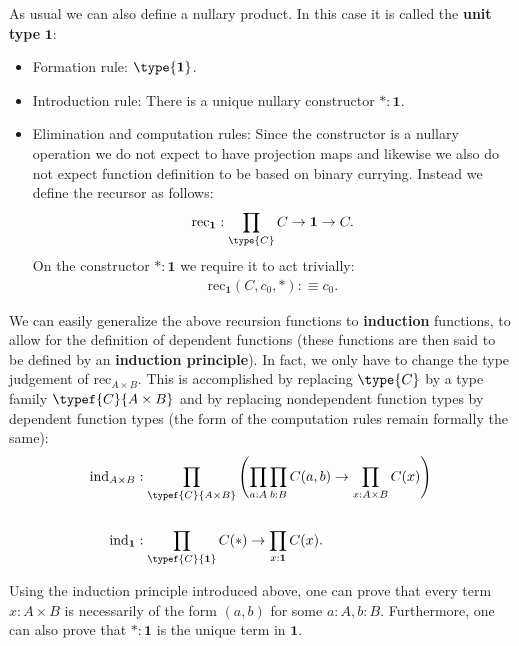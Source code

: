 {        As usual we can also define a nullary product. In this case it is called the \textbf{unit type} $\mathbf{1}$:
        \begin{itemize}
            \item Formation rule: $\type{\mathbf{1}}$.
            \item Introduction rule: There is a unique nullary constructor $\ast:\mathbf{1}$.
            \item Elimination and computation rules: Since the constructor is a nullary operation we do not expect to have projection maps and likewise we also do not expect function definition to be based on binary currying. Instead we define the recursor as follows:
            \begin{gather}
                \text{rec}_{\mathbf{1}}:\prod_{\type{C}}C\rightarrow\mathbf{1}\rightarrow C.
            \end{gather}
            On the constructor $\ast:\mathbf{1}$ we require it to act trivially:
            \begin{gather}
                \text{rec}_{\mathbf{1}}(C, c_0, \ast):\equiv c_0.
            \end{gather}
        \end{itemize}
        We can easily generalize the above recursion functions to \textbf{induction} functions, to allow for the definition of dependent functions (these functions are then said to be defined by an \textbf{induction principle}). In fact, we only have to change the type judgement of $\text{rec}_{A\times B}$. This is accomplished by replacing $\type{C}$ by a type family $\typef{C}{A\times B}$ and by replacing nondependent function types by dependent function types (the form of the computation rules remain formally the same):
        \begin{align}
            \text{ind}_{A\times B}&:\prod_{\typef{C}{A\times B}}\left(\prod_{a:A}\prod_{b:B}C(a,b)\rightarrow\prod_{x:A\times B}C(x)\right)\\
            &\nonumber\\
            \text{ind}_{\mathbf{1}}&:\prod_{\typef{C}{\mathbf{1}}}C(\ast)\rightarrow\prod_{x:\mathbf{1}}C(x).
        \end{align}
    }

    \begin{property}
        Using the induction principle introduced above, one can prove that every term $x:A\times B$ is necessarily of the form $(a,b)$ for some $a:A, b:B$. Furthermore, one can also prove that $\ast:\mathbf{1}$ is the unique term in $\mathbf{1}$.
    \end{property}

